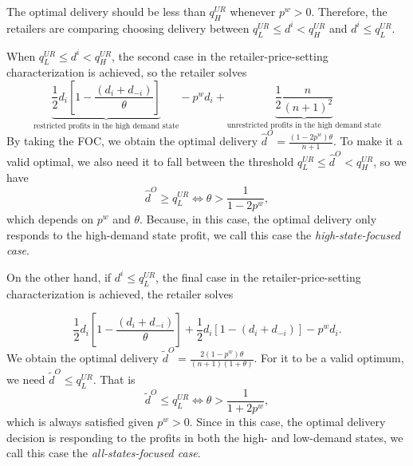 \documentclass[12pt]{article}
\begin{document}




 The optimal delivery should be less than $q^{UR}_H$ whenever $p^w > 0$. Therefore, the retailers are comparing choosing delivery between $ q_{L} ^{UR}\leq d^{i} < q_{H}^{UR}$ and $d^{i} \leq q_{L}^{UR}$. 

When $ q_{L} ^{UR}\leq d^{i} < q_{H}^{UR}$, the second case in the retailer-price-setting characterization is achieved,  so the retailer solves
\begin{equation}
	\underbrace{\frac{1}{2}d_i\left[1-\frac{(d_i + d_{-i})}{\theta}\right]}_{\text{restricted profits in the high demand state}} - p^w d_i + \underbrace{\frac{1}{2}\frac{n}{(n+1)^2}}_\text{unrestricted profits in the high demand state}
\end{equation}
By taking the FOC, we obtain the optimal delivery $\hat{d}^O = \frac{(1 - 2p^w)\theta}{n + 1}$. To make it a valid optimal, we also need it to fall between the threshold $ q_{L} ^{UR}\leq \hat{d}^{O} < q_{H}^{UR}$, so we have
\begin{equation}
\hat{d}^O \geq q_{L}^{UR} \iff \theta > \frac{1}{1 - 2p^w},
\end{equation}
which depends on $p^w$ and $\theta$. Because, in this case, the optimal delivery only responds to the high-demand state profit, we call this case the \textit{high-state-focused case}. 

On the other hand, if $d^{i} \leq q_{L}^{UR}$, the final case in the retailer-price-setting characterization is achieved, the retailer solves

\begin{equation}
	\frac{1}{2}d_i\left[1 -\frac{(d_i + d_{-i})}{\theta}\right] +	\frac{1}{2}d_i\left[1 -(d_i + d_{-i})\right] - p^w d_i.
\end{equation}
We obtain the optimal delivery  $\tilde{d}^O = \frac{2(1 - p^w)\theta}{(n + 1)(1 + \theta)}$. For it to be a valid optimum, we need  $\tilde{d}^O \leq q_{L}^{UR}$. That is 
\begin{equation}
    \tilde{d}^O \leq q_{L}^{UR} \iff \theta > \frac{1}{1 + 2p^w},
\end{equation}
which is always satisfied given $p^w > 0$. Since in this case, the optimal delivery decision is responding to the profits in both the high- and low-demand states, we call this case the \textit{all-states-focused case}. 
\end{document}
